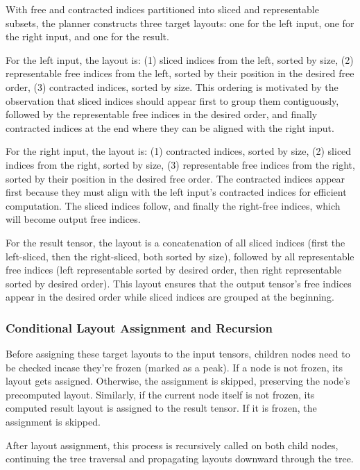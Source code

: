 With free and contracted indices partitioned into sliced and representable subsets, the planner constructs three target layouts: one for the left input, one for the right input, and one for the result.

For the left input, the layout is: (1) sliced indices from the left, sorted by size, (2) representable free indices from the left, sorted by their position in the desired free order, (3) contracted indices, sorted by size. This ordering is motivated by the observation that sliced indices should appear first to group them contiguously, followed by the representable free indices in the desired order, and finally contracted indices at the end where they can be aligned with the right input.

For the right input, the layout is: (1) contracted indices, sorted by size, (2) sliced indices from the right, sorted by size, (3) representable free indices from the right, sorted by their position in the desired free order. The contracted indices appear first because they must align with the left input's contracted indices for efficient computation. The sliced indices follow, and finally the right-free indices, which will become output free indices.

For the result tensor, the layout is a concatenation of all sliced indices (first the left-sliced, then the right-sliced, both sorted by size), followed by all representable free indices (left representable sorted by desired order, then right representable sorted by desired order). This layout ensures that the output tensor's free indices appear in the desired order while sliced indices are grouped at the beginning.

\subsubsection{Conditional Layout Assignment and Recursion}

Before assigning these target layouts to the input tensors, children nodes need to be checked incase they're frozen (marked as a peak). If a node is not frozen, its layout gets assigned. Otherwise, the assignment is skipped, preserving the node's precomputed layout. Similarly, if the current node itself is not frozen, its computed result layout is assigned to the result tensor. If it is frozen, the assignment is skipped.

After layout assignment, this process is recursively called on both child nodes, continuing the tree traversal and propagating layouts downward through the tree.

